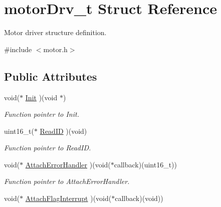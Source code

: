 \hypertarget{structmotor_drv__t}{}\section{motor\+Drv\+\_\+t Struct Reference}
\label{structmotor_drv__t}


Motor driver structure definition.  




{\ttfamily \#include $<$motor.\+h$>$}

\subsection*{Public Attributes}
\begin{DoxyCompactItemize}
\item 
\mbox{\label{structmotor_drv__t_a86d3d3dbef0e0f1698e1efe954532141}} 
void($\ast$ \mbox{\hyperlink{structmotor_drv__t_a86d3d3dbef0e0f1698e1efe954532141}{Init}} )(void $\ast$)
\begin{DoxyCompactList}\small\item\em Function pointer to Init. \end{DoxyCompactList}\item 
\mbox{\label{structmotor_drv__t_af319b5a6dc66a750bd942d543586e4dc}} 
uint16\+\_\+t($\ast$ \mbox{\hyperlink{structmotor_drv__t_af319b5a6dc66a750bd942d543586e4dc}{Read\+ID}} )(void)
\begin{DoxyCompactList}\small\item\em Function pointer to Read\+ID. \end{DoxyCompactList}\item 
\mbox{\label{structmotor_drv__t_a2b3cb9cf36826feabf6fe3c0b4bbc48b}} 
void($\ast$ \mbox{\hyperlink{structmotor_drv__t_a2b3cb9cf36826feabf6fe3c0b4bbc48b}{Attach\+Error\+Handler}} )(void($\ast$callback)(uint16\+\_\+t))
\begin{DoxyCompactList}\small\item\em Function pointer to Attach\+Error\+Handler. \end{DoxyCompactList}\item 
\mbox{\label{structmotor_drv__t_ae648f05bb2bc6e5f85da182eedaeca82}} 
void($\ast$ \mbox{\hyperlink{structmotor_drv__t_ae648f05bb2bc6e5f85da182eedaeca82}{Attach\+Flag\+Interrupt}} )(void($\ast$callback)(void))

\end{DoxyCompactItemize}
